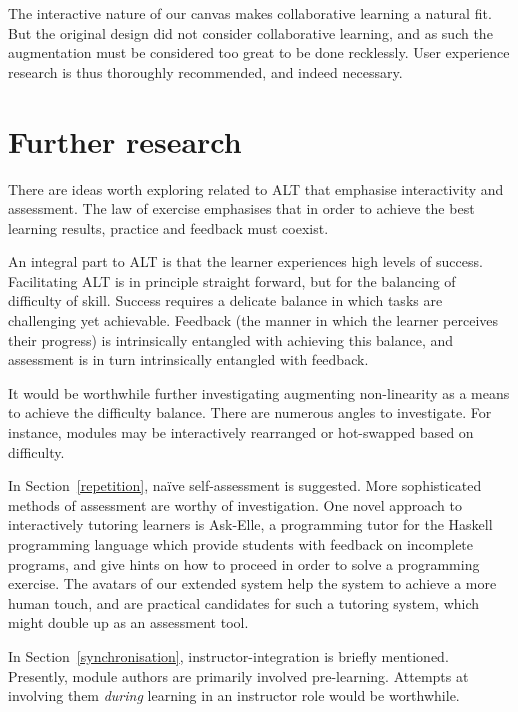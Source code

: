 \documentclass{article}
\begin{document}
\begin{multicols}{2}
The interactive nature of our canvas makes collaborative learning a natural 
fit. But the original design did not consider collaborative learning, and as 
such the augmentation must be considered too great to be done recklessly. User 
experience research is thus thoroughly recommended, and indeed necessary.
 
\section{Further research}
\label{further}
There are ideas worth exploring related to ALT that emphasise interactivity 
and assessment. The law of exercise emphasises that in order to achieve the 
best learning results, practice and feedback must 
coexist\cite{murphy2011games}.

An integral part to ALT is that the learner experiences high levels of 
success\cite{cotton1990educational, murphy2011games}. Facilitating ALT is in 
principle straight forward, but for the balancing of difficulty of skill. 
Success requires a delicate balance in which tasks are challenging yet 
achievable. Feedback (the manner in which the learner perceives their 
progress) is intrinsically entangled with achieving this balance, and 
assessment is in turn intrinsically entangled with 
feedback\cite{murphy2011games}.

It would be worthwhile further investigating augmenting non-linearity as a 
means to achieve the difficulty balance. There are numerous angles to 
investigate. For instance, modules may be interactively rearranged or 
hot-swapped based on difficulty.

In Section~\ref{repetition}, naïve self-assessment is suggested. More 
sophisticated methods of assessment are worthy of investigation. One novel 
approach to interactively tutoring learners is Ask-Elle, a programming tutor 
for the Haskell programming language which provide students with feedback on 
incomplete programs, and give hints on how to proceed in order to solve a 
programming exercise\cite{jeuring2012ask}. The avatars of our extended system 
help the system to achieve a more human touch\cite{berntsen2015enabling}, and 
are practical candidates for such a tutoring system, which might double up as 
an assessment tool.

In Section~\ref{synchronisation}, instructor-integration is briefly mentioned. 
Presently, module authors are primarily involved pre-learning. Attempts at 
involving them \emph{during} learning in an instructor role would be 
worthwhile.

\end{multicols}
\end{document}
